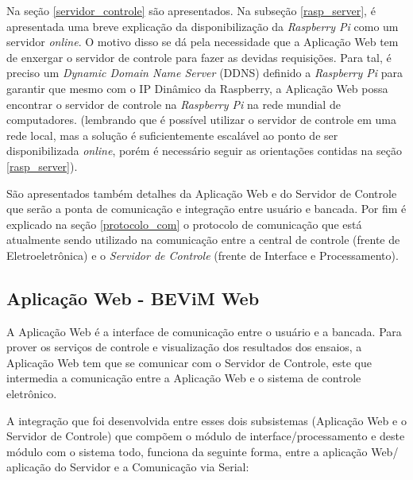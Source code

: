 Na seção \ref{servidor_controle} são apresentados. Na subseção \ref{rasp_server}, é apresentada uma breve explicação da disponibilização da \textit{Raspberry Pi} como um servidor \textit{online}.
O motivo disso se dá pela necessidade que a Aplicação Web tem de enxergar o servidor de controle  para fazer as devidas requisições.
Para tal, é preciso um \textit{Dynamic Domain Name Server} (DDNS) definido a \textit{Raspberry Pi} para garantir que mesmo com 
o IP Dinâmico da Raspberry, a Aplicação Web possa encontrar o servidor de controle na \textit{Raspberry Pi} na rede mundial de computadores.
(lembrando que é possível utilizar o servidor de controle em uma rede local, mas a solução é suficientemente escalável
ao ponto de ser disponibilizada \textit{online}, porém é necessário seguir as orientações contidas na seção \ref{rasp_server}).

São apresentados também detalhes da Aplicação Web e do Servidor de Controle que serão a ponta de comunicação e integração entre usuário e bancada.
Por fim é explicado na seção \ref{protocolo_com} o protocolo de comunicação que está atualmente sendo utilizado na comunicação entre a
central de controle (frente de Eletroeletrônica) e o \textit{Servidor de Controle} (frente de Interface e Processamento).

\subsection{Aplicação Web - BEViM Web}

A Aplicação Web é a interface de comunicação entre o usuário e a bancada. Para prover os serviços de controle e
visualização dos resultados dos ensaios, a Aplicação Web tem que se comunicar com o Servidor de Controle, este que intermedia
a comunicação entre a Aplicação Web e o sistema de controle eletrônico.

A integração que foi desenvolvida entre esses dois subsistemas (Aplicação Web e o Servidor de Controle) que compõem o módulo
de interface/processamento e deste módulo com o sistema todo, funciona da seguinte forma, entre a aplicação Web/ aplicação
do Servidor e a Comunicação via Serial:


